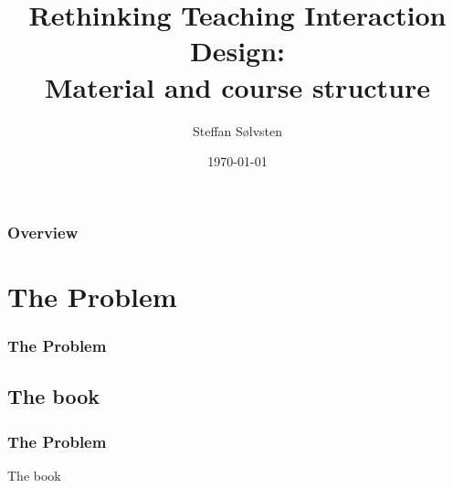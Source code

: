 

\title[Rethinking Teaching HCI]{
  Rethinking Teaching Interaction Design: \\ Material and course structure
}

\author{Steffan S\o lvsten} 
\date{\today}



\begin{frame}
  \titlepage
\end{frame}

\begin{frame}
  \frametitle{Overview}
  \tableofcontents
\end{frame}

\section{The Problem}
\begin{frame}
  \frametitle{The Problem}
\end{frame}

\subsection{The book}
\begin{frame}
  \frametitle{The Problem}
  \Huge{\centerline{The book}}
\end{frame}


